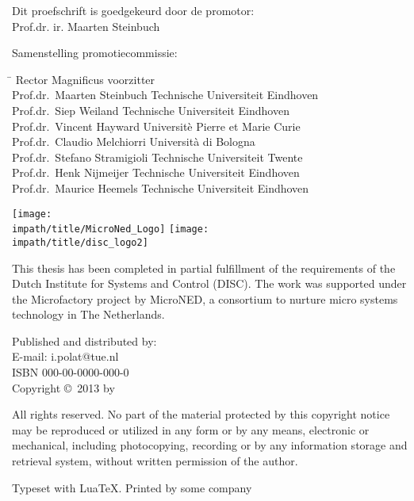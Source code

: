\newpage %
\thispagestyle{empty}

\noindent Dit proefschrift is goedgekeurd door de promotor:\\
Prof.dr. ir. Maarten Steinbuch\\
\bigskip{}

\noindent Samenstelling promotiecommissie:
\smallskip{}
\noindent
\begin{flushleft}\begin{tabbing}
\hspace*{50mm}\=\kill
Rector Magnificus \> voorzitter\\
Prof.dr.\ Maarten Steinbuch   \> Technische Universiteit Eindhoven\\
Prof.dr.\ Siep Weiland        \> Technische Universiteit Eindhoven\\
Prof.dr.\ Vincent Hayward     \> Universitè Pierre et Marie Curie\\
Prof.dr.\ Claudio Melchiorri  \> Università di Bologna\\
Prof.dr.\ Stefano Stramigioli \> Technische Universiteit Twente\\
Prof.dr.\ Henk Nijmeijer       \> Technische Universiteit Eindhoven\\
Prof.dr.\ Maurice Heemels     \> Technische Universiteit Eindhoven\\
\end{tabbing}\end{flushleft}
\smallskip\noindent
{
\flushleft\texttt{[image: \\impath/title/MicroNed\_Logo]}\hspace*{0.75cm}
\vspace{1em}
\texttt{[image: \\impath/title/disc\_logo2]}
\vspace{1em}


\parbox{\textwidth}{\noindent This thesis has been completed in partial fulfillment of
the requirements of the Dutch Institute for Systems and Control
(DISC). The work was supported under the Microfactory project by
MicroNED, a consortium to nurture micro systems technology in
The Netherlands.
}
\bigskip{}


Published and distributed by: \theauthor \\
E-mail: i.polat@tue.nl\\

\bigskip{}
ISBN 000-00-0000-000-0\\
Copyright \copyright~2013 by \theauthor
}


\bigskip{}
\noindent All rights reserved. No part of the material protected by
this copyright notice may be reproduced or utilized in any form or
by any means, electronic or mechanical, including photocopying,
recording or by any information storage and retrieval system,
without written permission of the author.

\bigskip{}
\noindent Typeset with Lua\kern-0.9bp\TeX. Printed by some company
